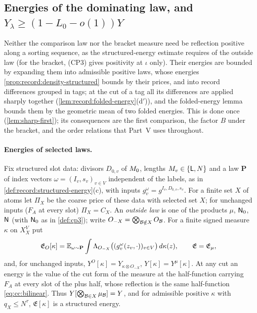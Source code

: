 \subsection{Energies of the dominating law, and \texorpdfstring{$Y_\lambda\ge(1-L_0-o(1))Y$}{Y\_lambda >= (1-L\_0-o(1))Y}}

Neither the comparison law nor the bracket measure need be reflection
positive along a sorting sequence, as the structured-energy estimate
requires of the outside law (for the bracket, (CP3) gives positivity at
$\iota$ only).
Their energies are bounded by expanding them into admissible positive laws,
whose energies \cref{prop:record:density-structured} bounds by their prices,
and into record differences grouped in tags; at the cut of a tag all its
differences are applied sharply together
(\cref{lem:record:folded-energy}(d$'$)), and the folded-energy lemma bounds
them by the geometric mean of two folded energies. This is done once
(\cref{lem:sharp-first}); its consequences are
the first comparison, the factor $B$ under the bracket, and the order
relations that Part~V uses throughout.

\paragraph{Energies of selected laws.}
Fix structured slot data: divisors $D_{0,v}$ of $M_0$, lengths
$M_v\in\{\mathsf L,N\}$ and a law $\mathbf P$ of index vectors
$\omega=(I_v,s_v)_{v\in V}$ independent of the labels, as in
\cref{def:record:structured-energy}(c), with inputs
$g^\omega_v=g^{I_v,D_{0,v},s_v}$. For a finite set $X$ of atoms let $\Pi_X$ be
the coarse price of these data with selected set $X$; for unchanged inputs
($F_A$ at every slot) $\Pi_X=C_X$. An \emph{outside law} is one of the
products $\mu$, $\mathsf N_0$, $\mathsf N$ (with $\mathsf N_0$ as in
\cref{def:cp3}); write $O_{-X}=\bigotimes_{\mathcal B\notin X}O_\mathcal B$.
For a finite signed measure $\kappa$ on $X_X^V$ put
\[
 \mathfrak E_O[\kappa]=\mathbb E_{\omega\sim\mathbf P}\int\Lambda_{O_{-X}}
 \bigl((g^\omega_v(z_v,\cdot))_{v\in V}\bigr)\,d\kappa(z),\qquad
 \mathfrak E=\mathfrak E_\mu,
\]
and, for unchanged inputs, $Y^O[\kappa]=Y_{\kappa\otimes O_{-X}}$,
$Y[\kappa]=Y^\mu[\kappa]$. At any cut an energy is the value of the cut form
of the measure at the half-function carrying $F_A$ at every slot of the plus
half, whose reflection is the same half-function \eqref{eq:cc:bilinear}.
Thus $Y[\bigotimes_{\mathcal B\in X}\mu_\mathcal B]=Y$, and for admissible positive
$\kappa$ with $q_X\le N^\tau$, $\mathfrak E[\kappa]$ is a structured energy.

